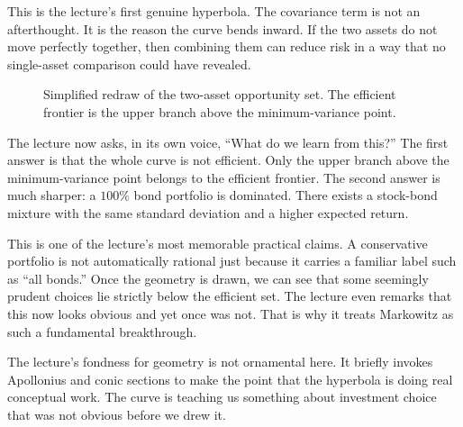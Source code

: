 This is the lecture's first genuine hyperbola. The covariance term is not an afterthought. It is the reason the curve bends inward. If the two assets do not move perfectly together, then combining them can reduce risk in a way that no single-asset comparison could have revealed.

\begin{figure}[h]
\centering
{}
\caption{Simplified redraw of the two-asset opportunity set. The efficient frontier is the upper branch above the minimum-variance point.}
\end{figure}

The lecture now asks, in its own voice, ``What do we learn from this?'' The first answer is that the whole curve is not efficient. Only the upper branch above the minimum-variance point belongs to the efficient frontier. The second answer is much sharper: a \(100\%\) bond portfolio is dominated. There exists a stock-bond mixture with the same standard deviation and a higher expected return.

This is one of the lecture's most memorable practical claims. A conservative portfolio is not automatically rational just because it carries a familiar label such as ``all bonds.'' Once the geometry is drawn, we can see that some seemingly prudent choices lie strictly below the efficient set. The lecture even remarks that this now looks obvious and yet once was not. That is why it treats Markowitz as such a fundamental breakthrough.

The lecture's fondness for geometry is not ornamental here. It briefly invokes Apollonius and conic sections to make the point that the hyperbola is doing real conceptual work. The curve is teaching us something about investment choice that was not obvious before we drew it.

